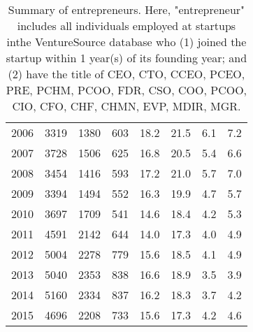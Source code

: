 \begin{table}[!htb]
\begin{tabular}{p{1.75cm}p{1.75cm}p{1.75cm}p{1.75cm}p{1.75cm}p{1.75cm}p{1.75cm}p{1.75cm}}
  2006 & 3319 & 1380 & 603 & 18.2 & 21.5 & 6.1 & 7.2 \\ 
  2007 & 3728 & 1506 & 625 & 16.8 & 20.5 & 5.4 & 6.6 \\ 
  2008 & 3454 & 1416 & 593 & 17.2 & 21.0 & 5.7 & 7.0 \\ 
  2009 & 3394 & 1494 & 552 & 16.3 & 19.9 & 4.7 & 5.7 \\ 
  2010 & 3697 & 1709 & 541 & 14.6 & 18.4 & 4.2 & 5.3 \\ 
  2011 & 4591 & 2142 & 644 & 14.0 & 17.3 & 4.0 & 4.9 \\ 
  2012 & 5004 & 2278 & 779 & 15.6 & 18.5 & 4.1 & 4.9 \\ 
  2013 & 5040 & 2353 & 838 & 16.6 & 18.9 & 3.5 & 3.9 \\ 
  2014 & 5160 & 2334 & 837 & 16.2 & 18.3 & 3.7 & 4.2 \\ 
  2015 & 4696 & 2208 & 733 & 15.6 & 17.3 & 4.2 & 4.6 \\ 
   \bottomrule
\end{tabular}
\endgroup
\caption{Summary of entrepreneurs. Here, "entrepreneur" includes all individuals employed at startups inthe VentureSource database who (1) joined the startup within 1 year(s) of its founding year; and (2) have the title of CEO, CTO, CCEO, PCEO, PRE, PCHM, PCOO, FDR, CSO, COO, PCOO, CIO, CFO, CHF, CHMN, EVP, MDIR, MGR.} 
\end{table}
